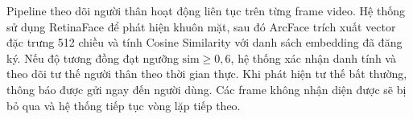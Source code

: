 




Pipeline theo dõi người thân hoạt động liên tục trên từng frame video. Hệ thống sử dụng
RetinaFace để phát hiện khuôn mặt, sau đó ArcFace trích xuất vector đặc trưng 512 chiều
và tính Cosine Similarity với danh sách embedding đã đăng ký. Nếu độ tương đồng đạt ngưỡng
$\text{sim} \geq 0{,}6$, hệ thống xác nhận danh tính và theo dõi tư thế người thân theo
thời gian thực. Khi phát hiện tư thế bất thường, thông báo được gửi ngay đến người dùng.
Các frame không nhận diện được sẽ bị bỏ qua và hệ thống tiếp tục vòng lặp tiếp theo.


